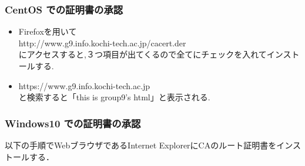 \documentclass[a4j,titlepage]{jarticle}
\begin{document}
\subsubsection{CentOS での証明書の承認}
\begin{itemize}
  
\item Firefoxを用いて\\
  http://www.g9.info.kochi-tech.ac.jp/cacert.der\\
  にアクセスすると,３つ項目が出てくるので全てにチェックを入れてインストールする.\\

\item https://www.g9.info.kochi-tech.ac.jp\\
  と検索すると「this is group9's html」と表示される.\\

\end{itemize}

\subsubsection{Windows10 での証明書の承認}
以下の手順でWebブラウザであるInternet ExplorerにCAのルート証明書をインストールする．
\end{document}
